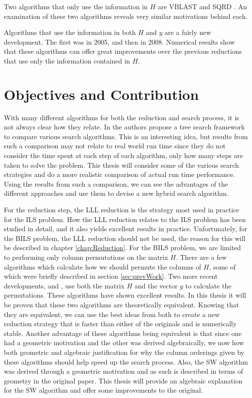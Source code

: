 \documentclass[12pt,Bold,letterpaper]{mcgilletdclass}
\begin{document}
Two algorithms that only use the information in $H$ are VBLAST \cite{FosGVW99} and SQRD \cite{WubBRKK01}. An examination of these two algorithms reveals very similar motivations behind each.

Algorithms that use the information in both $H$ and $y$ are a fairly new development. The first was \cite{SuW05} in 2005, and then \cite{ChaH05} in 2008. Numerical results show that these algorithms can offer great improvements over the previous reductions that use only the information contained in $H$.

\section{Objectives and Contribution}
With many different algorithms for both the reduction and search process, it is not always clear how they relate. In \cite{MurGDC06} the authors propose a tree search framework to compare various search algorithms. This is an interesting idea, but results from such a comparison may not relate to real world run time since they do not consider the time spent at each step of each algorithm, only how many steps are taken to solve the problem. This thesis will consider some of the various search strategies and do a more realistic comparison of actual run time performance. Using the results from such a comparison, we can see the advantages of the different approaches and use them to devise a new hybrid search algorithm.

For the reduction step, the LLL reduction \cite{LenLL82} is the strategy most used in practice for the ILS problem. How the LLL reduction relates to the ILS problem has been studied in detail, and it also yields excellent results in practice. Unfortunately, for the BILS problem, the LLL reduction should not be used, the reason for this will be described in chapter \ref{chap:Reduction}. For the BILS problem, we are limited to performing only column permutations on the matrix $H$. There are a few algorithms which calculate how we should permute the columns of $H$, some of which were briefly described in section \ref{sec:prevWork}. Two more recent developments, \cite{ChaH05} and \cite{SuW05}, use both the matrix $H$ and the vector $y$ to calculate the permutations. These algorithms have shown excellent results. In this thesis it will be proven that these two algorithms are theoretically equivalent. Knowing that they are equivalent, we can use the best ideas from both to create a new reduction strategy that is faster than either of the originals and is numerically stable. Another advantage of these algorithms being equivalent is that since one had a geometric motivation and the other was derived algebraically, we now how both geometric and algebraic justification for why the column orderings given by these algorithms should help speed up the search process. Also, the SW algorithm was derived through a geometric motivation and as such is described in terms of geometry in the original paper. This thesis will provide an algebraic explanation for the SW algorithm and offer some improvements to the original.
\end{document}

